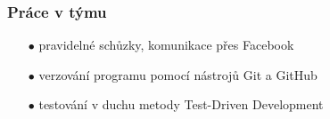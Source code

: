 \documentclass[10pt,xcolor=pdflatex]{beamer}
\begin{document}
\begin{frame}\frametitle{Práce v týmu}
    \begin{itemize}
	\item[$\bullet$] pravidelné schůzky, komunikace přes Facebook
	\item[$\bullet$] verzování programu pomocí nástrojů Git a GitHub
	\item[$\bullet$] testování v duchu metody Test-Driven Development
	\end{itemize}
\end{frame}



\end{document}
